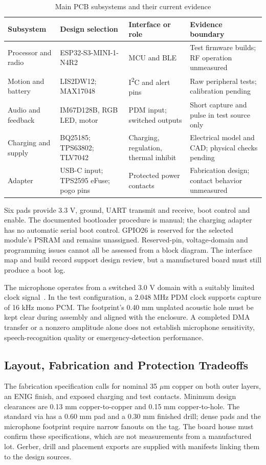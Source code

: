\documentclass[nolineno]{ieeeaccess}
\begin{document}
\begin{table}[t]
\caption{Main PCB subsystems and their current evidence}
\label{tab:components}
\centering
\begin{tabular}{p{}p{}p{}p{}}
\toprule
Subsystem & Design selection & Interface or role & Evidence boundary \\
\midrule
Processor and radio & ESP32-S3-MINI-1-N4R2 & MCU and BLE & Test firmware builds; RF operation unmeasured \\
Motion and battery & LIS2DW12; MAX17048 & I\textsuperscript{2}C and alert pins & Raw peripheral tests; calibration pending \\
Audio and feedback & IM67D128B, RGB LED, motor & PDM input; switched outputs & Short capture and pulse in test source only \\
Charging and supply & BQ25185; TPS63802; TLV7042 & Charging, regulation, thermal inhibit & Electrical model and CAD; physical checks pending \\
Adapter & USB-C input; TPS2595 eFuse; pogo pins & Protected power contacts & Fabrication design; contact behavior unmeasured \\
\bottomrule
\end{tabular}
\end{table}

Six pads provide 3.3 V, ground, UART transmit and receive, boot control and enable. The documented bootloader procedure is manual; the charging adapter has no automatic serial boot control. GPIO26 is reserved for the selected module's PSRAM and remains unassigned. Reserved-pin, voltage-domain and programming issues cannot all be assessed from a block diagram. The interface map and build record support design review, but a manufactured board must still produce a boot log.

The microphone operates from a switched 3.0 V domain with a suitably limited clock signal~\cite{micdatasheet}. In the test configuration, a 2.048 MHz PDM clock supports capture of 16 kHz mono PCM. The footprint's 0.40 mm unplated acoustic hole must be kept clear during assembly and aligned with the enclosure. A completed DMA transfer or a nonzero amplitude alone does not establish microphone sensitivity, speech-recognition quality or emergency-detection performance.

\subsection{Layout, Fabrication and Protection Tradeoffs}
The fabrication specification calls for nominal 35 \(\mu\)m copper on both outer layers, an ENIG finish, and exposed charging and test contacts. Minimum design clearances are 0.13 mm copper-to-copper and 0.15 mm copper-to-hole. The standard via has a 0.60 mm pad and a 0.30 mm finished drill; dense pads and the microphone footprint require narrow fanouts on the tag. The board house must confirm these specifications, which are not measurements from a manufactured lot. Gerber, drill and placement exports are supplied with manifests linking them to the design sources.
\end{document}

